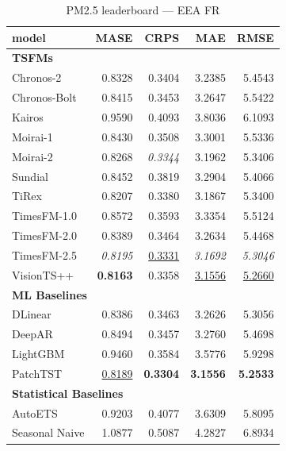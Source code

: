 \begin{table}[H]
\caption{PM2.5 leaderboard --- EEA FR}
\centering
\begin{small}
\begin{tabular}{lrrrr}
\toprule
model & MASE & CRPS & MAE & RMSE \\
\midrule
\multicolumn{5}{l}{\textbf{TSFMs}} \\
Chronos-2 & 0.8328 & 0.3404 & 3.2385 & 5.4543 \\
Chronos-Bolt & 0.8415 & 0.3453 & 3.2647 & 5.5422 \\
Kairos & 0.9590 & 0.4093 & 3.8036 & 6.1093 \\
Moirai-1 & 0.8430 & 0.3508 & 3.3001 & 5.5336 \\
Moirai-2 & 0.8268 & \textit{0.3344} & 3.1962 & 5.3406 \\
Sundial & 0.8452 & 0.3819 & 3.2904 & 5.4066 \\
TiRex & 0.8207 & 0.3380 & 3.1867 & 5.3400 \\
TimesFM-1.0 & 0.8572 & 0.3593 & 3.3354 & 5.5124 \\
TimesFM-2.0 & 0.8389 & 0.3464 & 3.2634 & 5.4468 \\
TimesFM-2.5 & \textit{0.8195} & \underline{0.3331} & \textit{3.1692} & \textit{5.3046} \\
VisionTS++ & \textbf{0.8163} & 0.3358 & \underline{3.1556} & \underline{5.2660} \\
\midrule
\multicolumn{5}{l}{\textbf{ML Baselines}} \\
DLinear & 0.8386 & 0.3463 & 3.2626 & 5.3056 \\
DeepAR & 0.8494 & 0.3457 & 3.2760 & 5.4698 \\
LightGBM & 0.9460 & 0.3584 & 3.5776 & 5.9298 \\
PatchTST & \underline{0.8189} & \textbf{0.3304} & \textbf{3.1556} & \textbf{5.2533} \\
\midrule
\multicolumn{5}{l}{\textbf{Statistical Baselines}} \\
AutoETS & 0.9203 & 0.4077 & 3.6309 & 5.8095 \\
Seasonal Naive & 1.0877 & 0.5087 & 4.2827 & 6.8934 \\
\bottomrule
\end{tabular}
\end{small}
\end{table}